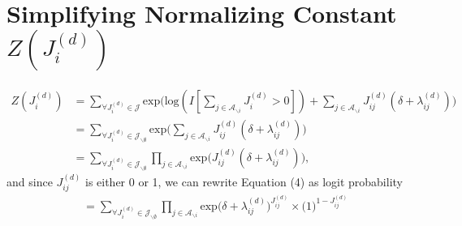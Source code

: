 \documentclass[a4paper]{article}
\begin{document}
\section{Simplifying Normalizing Constant $Z(J_i^{(d)})$}
\begin{equation}
\begin{aligned}
Z(J^{(d)}_i) &= \sum\limits_{\forall J^{(d)}_i \in \mathcal{J}}\mbox{exp}\Big(\mbox{log}(I[\sum\limits_{j \in \mathcal{A}_{\backslash i}}J^{(d)}_i>0])+\sum\limits_{j \in \mathcal{A}_{\backslash i}}J^{(d)}_{ij}(\delta+\lambda^{(d)}_{ij})\Big)\\&
=\sum\limits_{\forall J^{(d)}_i  \in \mathcal{J}_{\backslash \emptyset}}\mbox{exp}\Big(\sum\limits_{j \in \mathcal{A}_{\backslash i}}J^{(d)}_{ij}(\delta+\lambda^{(d)}_{ij})\Big)\\&
= \sum\limits_{\forall J^{(d)}_i  \in \mathcal{J}_{\backslash \emptyset}} \prod\limits_{j \in \mathcal{A}_{\backslash i}}\mbox{exp}\Big(J^{(d)}_{ij}(\delta+ \lambda^{(d)}_{ij})\Big),
\end{aligned}
\end{equation}
and since $J^{(d)}_{ij}$ is either 0 or 1, we can rewrite Equation (4) as logit probability
\begin{equation}
\begin{aligned}
&
= \sum\limits_{\forall J^{(d)}_i  \in \mathcal{J}_{\backslash \emptyset}} \prod\limits_{j \in \mathcal{A}_{\backslash i}}\mbox{exp}\Big(\delta+ \lambda^{(d)}_{ij}\Big)^{J^{(d)}_{ij}}\times \Big(1\Big)^{1 - J^{(d)}_{ij}}
\end{aligned}
\end{equation}
\end{document}
